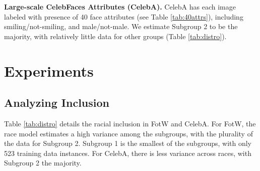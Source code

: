 \documentclass{article}
\begin{document}



{\bf Large-scale CelebFaces Attributes (CelebA).} CelebA \cite{liuetal2015celeba} has each image labeled with presence of 40 face attributes (see Table \ref{tab:40attrs}), including smiling/not-smiling, and male/not-male. We estimate Subgroup 2 to be the majority, with relatively little data for other groups (Table \ref{tab:distro}).\vspace{-1em}

\section{Experiments}\vspace{-.3em}

\subsection{Analyzing Inclusion}\vspace{-.3em}

Table \ref{tab:distro} details the racial inclusion in FotW and CelebA.  For FotW, the race model estimates a high variance among the subgroups, with the plurality of the data for Subgroup 2.  Subgroup 1 is the smallest of the subgroups, with only 523 training data instances.  %
For CelebA, there is less variance across races, with Subgroup 2 the majority.\vspace{-.5em}
\end{document}

